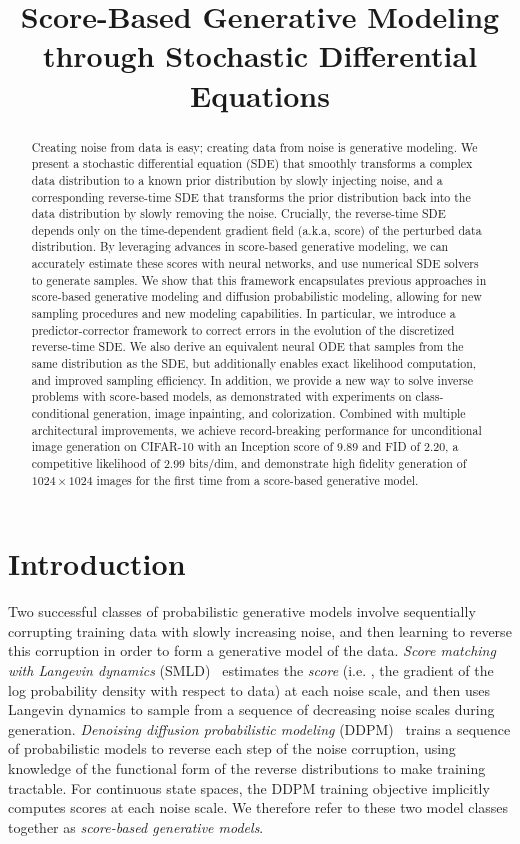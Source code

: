 \title{Score-Based Generative Modeling through Stochastic Differential Equations}

\begin{abstract}
Creating noise from data is easy; creating data from noise is generative modeling. We present a stochastic differential equation (SDE) that smoothly transforms a complex data distribution to a known prior distribution by slowly injecting noise, and a corresponding reverse-time SDE that transforms the prior distribution back into the data distribution by slowly removing the noise. Crucially, the reverse-time SDE depends only on the time-dependent gradient field (a.k.a\onedot, score) of the perturbed data distribution. By leveraging advances in score-based generative modeling, we can accurately estimate these scores with neural networks, and use numerical SDE solvers to generate samples. We show that this framework encapsulates previous approaches in score-based generative modeling and diffusion probabilistic modeling, allowing for new sampling procedures and new modeling capabilities. In particular, we introduce a predictor-corrector framework to correct errors in the evolution of the discretized reverse-time SDE. We also derive an equivalent neural ODE that samples from the same distribution as the SDE, but additionally enables exact likelihood computation, and improved sampling efficiency. In addition, we provide a new way to solve inverse problems with score-based models, as demonstrated with experiments on class-conditional generation, image inpainting, and colorization. Combined with multiple architectural improvements, we achieve record-breaking performance for unconditional image generation on CIFAR-10 with an Inception score of 9.89 and FID of 2.20, a competitive likelihood of 2.99 bits/dim, and demonstrate high fidelity generation of $1024\times 1024$ images for the first time from a score-based generative model.
\end{abstract}

\section{Introduction}

Two successful classes of probabilistic generative models involve sequentially corrupting training data with slowly increasing noise, and then learning to reverse this corruption in order to form a generative model of the data. 
\emph{Score matching with Langevin dynamics} (SMLD)~\citep{song2019generative} estimates the \emph{score} (i.e. , the gradient of the log probability density with respect to data) at each noise scale, and then uses Langevin dynamics to sample from a sequence of decreasing noise scales during generation. 
\emph{Denoising diffusion probabilistic modeling} (DDPM)~\citep{sohl2015deep,ho2020denoising} trains a sequence of probabilistic models to reverse each step of the noise corruption, using knowledge of the functional form of the reverse distributions to make training tractable. For continuous state spaces, the DDPM training objective implicitly computes scores at each noise scale. We therefore refer to these two model classes together as \emph{score-based generative models}. 

